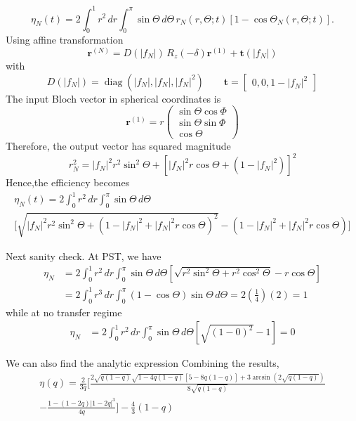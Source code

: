\documentclass[../../../main.tex]{subfiles}
\begin{document}
\begin{equation*}
  \eta_N(t)=2\int_0^1r^2\,dr\int_0^\pi\sin\Theta\,d\Theta\,r_N(r,\Theta;t)\left[1-\cos\Theta_N(r,\Theta;t)\right].
\end{equation*}
Using affine transformation 
\begin{equation*}
  \mathbf r^{(N)}  =  D(|f_N|)\,R_z(-\delta) \mathbf r^{(1)} +\mathbf t(|f_N|)
\end{equation*}
with
\begin{equation*}
  D(|f_N|) = \operatorname{diag}(|f_N|,|f_N|,|f_N|^2)
  \qquad
  \textbf{t} = \begin{bmatrix} 0, 0,1-|f_N|^2 \end{bmatrix}
\end{equation*}
The input Bloch vector in spherical coordinates is
\begin{equation*}
  \mathbf r^{(1)}=
r\begin{pmatrix}
\sin\Theta\cos\Phi\\
\sin\Theta\sin\Phi\\
\cos\Theta
\end{pmatrix}
\end{equation*}
Therefore, the output vector has squared magnitude
\begin{equation*}
  r_N^2 = |f_N|^2r^2\sin^2\Theta+\left[|f_N|^2 r\cos\Theta+(1-|f_N|^2 )\right]^2
\end{equation*}
Hence,the efficiency becomes
\begin{multline*}
  \eta_N(t)=2\int_0^1r^2\,dr
\int_0^\pi\sin\Theta\,d\Theta\\
\Bigg[
\sqrt{|f_N|^2r^2\sin^2\Theta+(1-|f_N|^2 +|f_N|^2 r\cos\Theta)^2}-(1-|f_N|^2+|f_N|^2 r\cos\Theta)
\Bigg]
\end{multline*}

Next sanity check.
At PST, we have 
\begin{align*}
  \eta_N
&=2\int_0^1r^2\,dr\int_0^\pi\sin\Theta\,d\Theta\left[\sqrt{r^2\sin^2\Theta+r^2\cos^2\Theta}-r\cos\Theta\right]\\
&=2\int_0^1r^3\,dr\int_0^\pi(1-\cos\Theta)\sin\Theta\,d\Theta=2\left(\frac14\right)(2) = 1
\end{align*}
while at no transfer regime 
\begin{align*}
 \eta_N
&=2\int_0^1r^2\,dr\int_0^\pi\sin\Theta\,d\Theta\left[\sqrt{(1-0)^2}-1\right] = 0
\end{align*}

We can also find the analytic expression
Combining the results,
\begin{multline*}
  \eta(q)=
\frac{2}{3q}
\bigg[
\frac{
2\sqrt{q(1-q)}
\sqrt{1-4q(1-q)}
[5-8q(1-q)]
+3\arcsin\!\left(2\sqrt{q(1-q)}\right)
}{
8\sqrt{q(1-q)}
}\\
-\frac{1-(1-2q)|1-2q|^3}{4q}
\bigg]
-\frac43(1-q)
\end{multline*}
\end{document}
